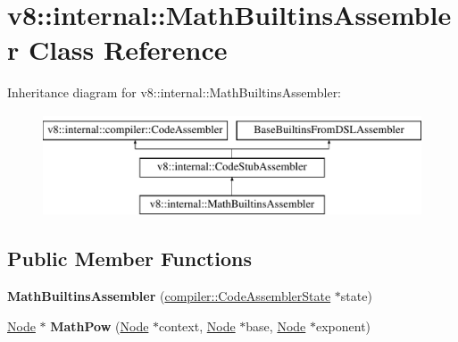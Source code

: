 \hypertarget{classv8_1_1internal_1_1MathBuiltinsAssembler}{}\section{v8\+:\+:internal\+:\+:Math\+Builtins\+Assembler Class Reference}
\label{classv8_1_1internal_1_1MathBuiltinsAssembler}
Inheritance diagram for v8\+:\+:internal\+:\+:Math\+Builtins\+Assembler\+:\begin{figure}[H]
\begin{center}
\leavevmode
\includegraphics[height=3.000000cm]{classv8_1_1internal_1_1MathBuiltinsAssembler}
\end{center}
\end{figure}
\subsection*{Public Member Functions}
\begin{DoxyCompactItemize}
\item 
\mbox{\label{classv8_1_1internal_1_1MathBuiltinsAssembler_a0c770dc25ff41d4225c229f5dd988fde}} 
{\bfseries Math\+Builtins\+Assembler} (\mbox{\hyperlink{classv8_1_1internal_1_1compiler_1_1CodeAssemblerState}{compiler\+::\+Code\+Assembler\+State}} $\ast$state)
\item 
\mbox{\label{classv8_1_1internal_1_1MathBuiltinsAssembler_ad9cea976c640e909c3988042f597ef27}} 
\mbox{\hyperlink{classv8_1_1internal_1_1compiler_1_1Node}{Node}} $\ast$ {\bfseries Math\+Pow} (\mbox{\hyperlink{classv8_1_1internal_1_1compiler_1_1Node}{Node}} $\ast$context, \mbox{\hyperlink{classv8_1_1internal_1_1compiler_1_1Node}{Node}} $\ast$base, \mbox{\hyperlink{classv8_1_1internal_1_1compiler_1_1Node}{Node}} $\ast$exponent)
\end{DoxyCompactItemize}
